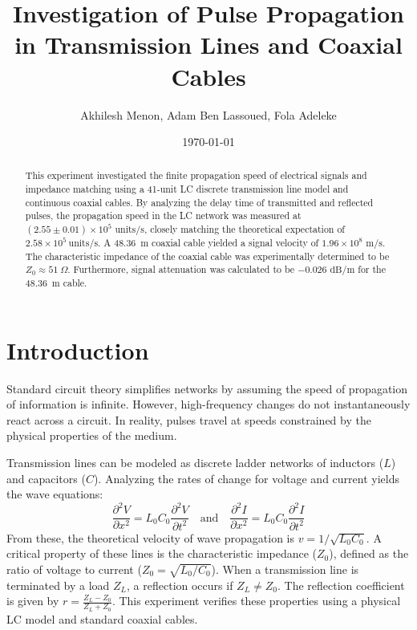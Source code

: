 \documentclass[11pt, letterpaper]{article}
\title{\textbf{Investigation of Pulse Propagation in Transmission Lines and Coaxial Cables}}
\author{Akhilesh Menon, Adam Ben Lassoued, Fola Adeleke}
\date{\today}
\begin{document}
\maketitle

\begin{abstract}
This experiment investigated the finite propagation speed of electrical signals and impedance matching using a 41-unit LC discrete transmission line model and continuous coaxial cables. By analyzing the delay time of transmitted and reflected pulses, the propagation speed in the LC network was measured at $(2.55 \pm 0.01) \times 10^5 \text{ units/s}$, closely matching the theoretical expectation of $2.58 \times 10^5\ \text{units/s}$. A \qty{48.36}{m} coaxial cable yielded a signal velocity of $1.96 \times 10^8 \text{ m/s}$. The characteristic impedance of the coaxial cable was experimentally determined to be $Z_0 \approx 51\ \Omega$. Furthermore, signal attenuation was calculated to be $-0.026 \text{ dB/m}$ for the \qty{48.36}{m} cable.
\end{abstract}

\section{Introduction}
Standard circuit theory simplifies networks by assuming the speed of propagation of information is infinite. However, high-frequency changes do not instantaneously react across a circuit. In reality, pulses travel at speeds constrained by the physical properties of the medium.

Transmission lines can be modeled as discrete ladder networks of inductors ($L$) and capacitors ($C$). Analyzing the rates of change for voltage and current yields the wave equations:
\begin{equation}
\frac{\partial^{2}V}{\partial x^{2}}=L_{0}C_{0}\frac{\partial^{2}V}{\partial t^{2}} \quad \text{and} \quad \frac{\partial^{2}I}{\partial x^{2}}=L_{0}C_{0}\frac{\partial^{2}I}{\partial t^{2}}
\end{equation}
From these, the theoretical velocity of wave propagation is $v = 1/\sqrt{L_0C_0}$. A critical property of these lines is the characteristic impedance ($Z_0$), defined as the ratio of voltage to current ($Z_0 = \sqrt{L_0/C_0}$). When a transmission line is terminated by a load $Z_L$, a reflection occurs if $Z_L \neq Z_0$. The reflection coefficient is given by $r = \frac{Z_L - Z_0}{Z_L + Z_0}$. This experiment verifies these properties using a physical LC model and standard coaxial cables.
\end{document}
